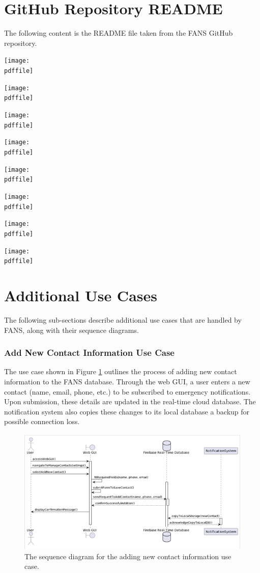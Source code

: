 \appendix

\pagebreak
\section{GitHub Repository README}

The following content is the README file taken from the FANS GitHub repository.

\def\pdffile{../../README.pdf}

\begin{center}
    \texttt{[image: \\pdffile]}

    \texttt{[image: \\pdffile]}

    \texttt{[image: \\pdffile]}

    \texttt{[image: \\pdffile]}

    \texttt{[image: \\pdffile]}

    \texttt{[image: \\pdffile]}

    \texttt{[image: \\pdffile]}

    \texttt{[image: \\pdffile]}
\end{center}

\section{Additional Use Cases} \label{ap:sequence}

The following sub-sections describe additional use cases that are handled by FANS, along with their sequence diagrams.

\subsubsection{Add New Contact Information Use Case}

The use case shown in Figure \ref{fig:add-contact} outlines the process of adding new contact information to the FANS
database. Through the web GUI, a user enters a new contact (name, email, phone, etc.) to be subscribed to emergency
notifications. Upon submission, these details are updated in the real-time cloud database. The notification system also
copies these changes to its local database a backup for possible connection loss.

\begin{figure}
    \centering
    \includegraphics[width=\imagewidth]{../assets/sequence/AddingNewContactInformationSequenceDiagram.png}
    \caption{The sequence diagram for the adding new contact information use case.}
    \label{fig:add-contact}
\end{figure}
